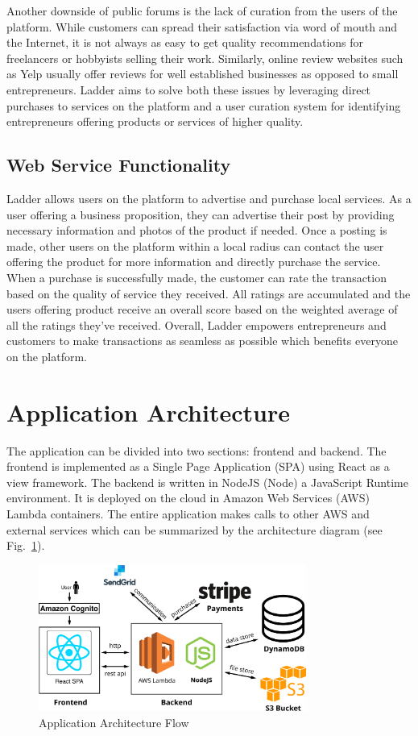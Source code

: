 \documentclass[conference]{IEEEtran}
\begin{document}
Another downside of public forums is the lack of curation from the users of the platform. While customers can spread their satisfaction via word of mouth and the Internet, it is not always as easy to get quality recommendations for freelancers or hobbyists selling their work. Similarly, online review websites such as Yelp usually offer reviews for well established businesses as opposed to small entrepreneurs. Ladder aims to solve both these issues by leveraging direct purchases to services on the platform and a user curation system for identifying entrepreneurs offering products or services of higher quality.

\subsection{Web Service Functionality}
Ladder allows users on the platform to advertise and purchase local services. As a user offering a business proposition, they can advertise their post by providing necessary information and photos of the product if needed. Once a posting is made, other users on the platform within a local radius can contact the user offering the product for more information and directly purchase the service. When a purchase is successfully made, the customer can rate the transaction based on the quality of service they received. All ratings are accumulated and the users offering product receive an overall score based on the weighted average of all the ratings they've received. Overall, Ladder empowers entrepreneurs and customers to make transactions as seamless as possible which benefits everyone on the platform.

\section{Application Architecture}
The application can be divided into two sections: frontend and backend. The frontend is implemented as a Single Page Application (SPA) using React as a view framework. The backend is written in NodeJS (Node) a JavaScript Runtime environment. It is deployed on the cloud in Amazon Web Services (AWS) Lambda containers. The entire application makes calls to other AWS and external services which can be summarized by the architecture diagram (see Fig.~\ref{fig:architecture}).

\begin{figure}[htbp]
\centerline{\includegraphics[width=\textwidth,height=4.8cm,keepaspectratio]{architecture.png}}
\caption{Application Architecture Flow}
\label{fig:architecture}
\end{figure}
\end{document}
